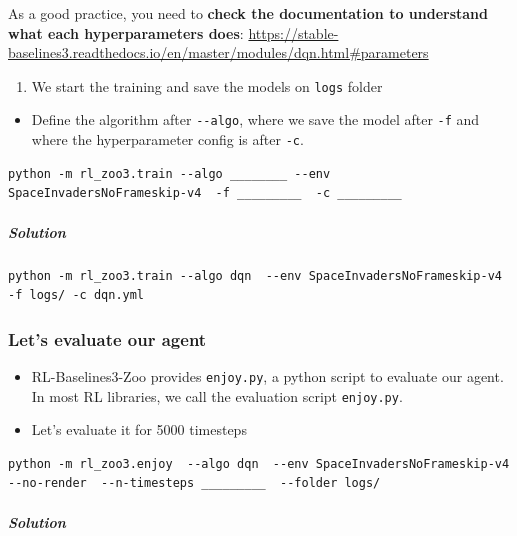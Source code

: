 \documentclass[11pt,a4paper]{article}
\begin{document}
As a good practice, you need to \textbf{check the documentation to understand what each hyperparameters does}: \url{https://stable-baselines3.readthedocs.io/en/master/modules/dqn.html#parameters}

\begin{enumerate}
\def\labelenumi{\arabic{enumi}.}
\setcounter{enumi}{1}
\tightlist
\item
  We start the training and save the models on \texttt{logs} folder
\end{enumerate}

\begin{itemize}
\tightlist
\item
  Define the algorithm after \texttt{-\/-algo}, where we save the model after \texttt{-f} and where the hyperparameter config is after \texttt{-c}.
\end{itemize}

\begin{lstlisting}
python -m rl_zoo3.train --algo ________ --env SpaceInvadersNoFrameskip-v4  -f _________  -c _________
\end{lstlisting}

\subparagraph{Solution}\label{solution}

\begin{lstlisting}
python -m rl_zoo3.train --algo dqn  --env SpaceInvadersNoFrameskip-v4 -f logs/ -c dqn.yml
\end{lstlisting}

\subsubsection{Let's evaluate our agent}\label{lets-evaluate-our-agent}

\begin{itemize}
\tightlist
\item
  RL-Baselines3-Zoo provides \texttt{enjoy.py}, a python script to evaluate our agent. In most RL libraries, we call the evaluation script \texttt{enjoy.py}.
\item
  Let's evaluate it for 5000 timesteps
\end{itemize}

\begin{lstlisting}
python -m rl_zoo3.enjoy  --algo dqn  --env SpaceInvadersNoFrameskip-v4  --no-render  --n-timesteps _________  --folder logs/
\end{lstlisting}

\subparagraph{Solution}\label{solution-1}
\end{document}
